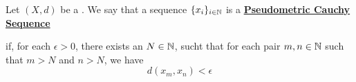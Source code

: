 \label{def:pseudometriccauchysequence}
\newcommand{\PseudometricCauchySequence}[0]{
    \bf \hyperref[def:pseudometriccauchysequence]{Pseudometric Cauchy Sequence} \rm
}
\begin{df}

    Let $(X,d)$ be a \PseudometricSpace.
    We say that a sequence $\{x_i\}_{i \in \mathbb{N}}$ is a \PseudometricCauchySequence
    if, for each $\epsilon > 0$, there exists an $N \in \mathbb{N}$, sucht that for 
    each pair $m,n \in \mathbb{N}$ such that $m>N$ and $n>N$, we have 
    \begin{equation}
        d(x_m,x_n) < \epsilon
    \end{equation}
\end{df}

